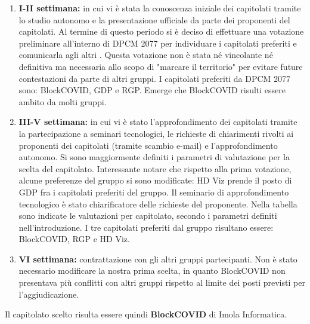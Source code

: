 \begin{enumerate}
\item \textbf{I-II settimana:} in cui vi è stata la conoscenza iniziale dei capitolati tramite lo studio autonomo e la presentazione ufficiale da parte dei proponenti del capitolati. Al termine di questo periodo si è deciso di effettuare una votazione preliminare all'interno di DPCM 2077 per individuare i capitolati preferiti e comunicarla agli altri . Questa votazione non è stata né vincolante né definitiva ma necessaria allo scopo di "marcare il territorio" per evitare future contestazioni da parte di altri gruppi. I capitolati preferiti da DPCM 2077 sono: BlockCOVID, GDP e RGP. Emerge che BlockCOVID risulti essere ambito da molti gruppi.  
\item \textbf{III-V settimana:} in cui vi è stato l'approfondimento dei capitolati tramite la partecipazione a seminari tecnologici, le richieste di chiarimenti rivolti ai proponenti dei capitolati (tramite scambio e-mail) e l'approfondimento autonomo. Si sono maggiormente definiti i parametri di valutazione per la scelta del capitolato. Interessante notare che rispetto alla prima votazione, alcune preferenze del gruppo si sono modificate: HD Viz prende il posto di GDP fra i capitolati preferiti del gruppo. Il seminario di approfondimento tecnologico è stato chiarificatore delle richieste del proponente. Nella tabella sono indicate le valutazioni per capitolato, secondo i parametri definiti nell'introduzione. I tre capitolati preferiti dal gruppo risultano essere: BlockCOVID, RGP e HD Viz.
\item \textbf{VI settimana:} contrattazione con gli altri gruppi partecipanti. Non è stato necessario modificare la nostra prima scelta, in quanto BlockCOVID non presentava più conflitti con altri gruppi rispetto al limite dei posti previsti per l'aggiudicazione.
\end{enumerate}

Il capitolato scelto risulta essere quindi \textbf{BlockCOVID} di Imola Informatica.